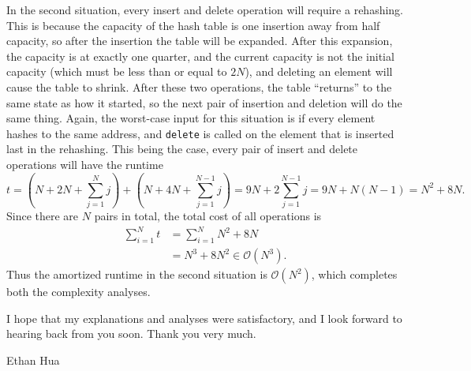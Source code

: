 \documentclass[11pt]{article}
\begin{document}
    In the second situation, every insert and delete operation will require a rehashing. This is because the capacity of the hash table is one insertion away from half capacity, so after the insertion the table will be expanded. After this expansion, the capacity is at exactly one quarter, and the current capacity is not the initial capacity (which must be less than or equal to \(2N\)), and deleting an element will cause the table to shrink. After these two operations, the table ``returns'' to the same state as how it started, so the next pair of insertion and deletion will do the same thing. Again, the worst-case input for this situation is if every element hashes to the same address, and \texttt{delete} is called on the element that is inserted last in the rehashing. This being the case, every pair of insert and delete operations will have the runtime
    \[
        t = \left(N + 2N + \sum_{j=1}^{N} j\right) + \left( N + 4N + \sum_{j=1}^{N-1} j \right) = 9N + 2\sum_{j=1}^{N-1} j = 9N + N(N-1) = N^2 + 8N.
    \]
    Since there are \(N\) pairs in total, the total cost of all operations is
    \begin{align*}
        \sum_{i=1}^{N} t &= \sum_{i=1}^{N} N^2 + 8N \\
        &= N^3 + 8N^2 \in \mathcal{O} (N^3).
    \end{align*}
    Thus the amortized runtime in the second situation is \(\mathcal{O} (N^2)\), which completes both the complexity analyses.
    
    I hope that my explanations and analyses were satisfactory, and I look forward to hearing back from you soon. Thank you very much.

    \medskip

    Ethan Hua
\end{document}
